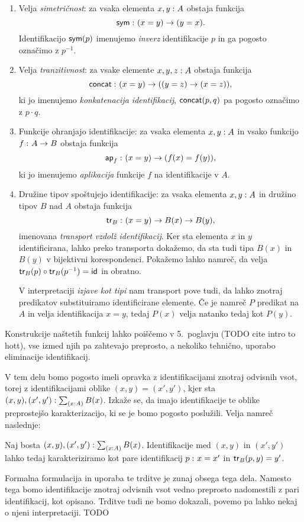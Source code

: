 \begin{enumerate}
\item Velja \emph{simetričnost}: za vsaka elementa \(x, y : A\) obstaja
  funkcija \[\textnormal{\textsf{sym}} \,\colon (x = y) \to (y = x).\] Identifikacijo \(\textnormal{\textsf{sym}}(p)\)
  imenujemo \emph{inverz} identifikacije \(p\) in ga pogosto označimo z \(p^{-1}\).
\item Velja \emph{tranzitivnost}: za vsake elemente \(x, y, z : A\) obstaja
  funkcija \[\textnormal{\textsf{concat}} \,\colon (x = y) \to ((y = z) \to (x = z)),\] ki jo imenujemo
  \emph{konkatenacija identifikacij}, \(\textnormal{\textsf{concat}}(p, q)\) pa pogosto označimo
  z \(p \cdot q\).
\item Funkcije ohranjajo identifikacije: za vsaka elementa \(x, y : A\)
  in vsako funkcijo \(f \,\colon A \to B\) obstaja funkcija
  \[\textnormal{\textsf{ap}}_{f} \,\colon (x = y) \to (f(x) = f(y)),\]
  ki jo imenujemo \emph{aplikacija} funkcije \(f\) na identifikacije v \(A\).
\item Družine tipov spoštujejo identifikacije: za vsaka elementa
  \(x, y : A\) in družino tipov
  \(B\) nad \(A\) obstaja funkcija
  \[\textnormal{\textsf{tr}}_{B} \,\colon (x = y) \to B(x) \to B(y),\]
  imenovana \emph{transport vzdolž identifikacij}.
  Ker sta elementa \(x\) in \(y\) identificirana, lahko preko transporta dokažemo, da sta
  tudi tipa \(B(x)\) in \(B(y)\) v bijektivni korespondenci. Pokažemo lahko namreč, da
  velja \(\textnormal{\textsf{tr}}_{B}(p) \circ \textnormal{\textsf{tr}}_{B}(p^{-1}) = \textnormal{\textsf{id}}_{}\) in obratno.

  V interpretaciji \emph{izjave kot tipi} nam transport pove tudi, da lahko znotraj
  predikatov substituiramo identificirane elemente. Če je namreč \(P\) predikat
  na \(A\) in velja identifikacija \(x = y\), tedaj \(P(x)\) velja natanko tedaj kot
  \(P(y)\).

\end{enumerate}
Konstrukcije naštetih funkcij lahko poiščemo v 5.~poglavju (TODO cite intro to hott), vse
izmed njih pa zahtevajo preprosto, a nekoliko tehnično, uporabo eliminacije identifikacij.

\pagebreak

V tem delu bomo pogosto imeli opravka z identifikacijami znotraj odvisnih vsot, torej z identifikacijami oblike \((x, y) = (x', y')\), kjer sta
\((x, y), (x', y') : \textstyle \sum_{\left( x : A \right)} B(x)\). Izkaže se, da imajo identifikacije te oblike preprostejšo karakterizacijo, ki se je bomo pogosto poslužili.
Velja namreč naslednje:
\begin{trditev}
  Naj bosta \((x, y), (x', y') : \textstyle \sum_{\left( x : A \right)} B(x)\). Identifikacije med \((x, y)\) in \((x', y')\) lahko tedaj karakteriziramo kot pare identifikacij
  \(p \,\colon x = x'\) in \(\textnormal{\textsf{tr}}_{B}(p, y) = y'\).
\end{trditev}
Formalna formulacija in uporaba te trditve je zunaj obsega tega dela. Namesto tega bomo identifikacije znotraj odvisnih vsot vedno preprosto nadomestili z pari identifikacij, kot opisano. Trditve tudi ne bomo dokazali, povemo pa lahko nekaj o njeni interpretaciji. TODO

